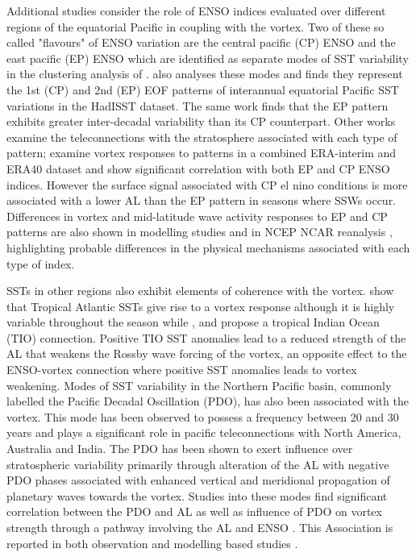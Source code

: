 Additional studies consider the role of ENSO indices evaluated over different regions of the equatorial Pacific in coupling with the vortex. Two of these so called  "flavours" of ENSO variation are the central pacific (CP) ENSO and the east pacific (EP) ENSO which are identified as separate modes of SST variability in the clustering analysis of \citep{johnsonHow2013a}. \cite{kaoContrasting2009} also analyses these modes and finds they represent the 1st (CP) and 2nd (EP) EOF patterns of interannual equatorial Pacific SST variations in the HadISST dataset. The same work finds that the EP pattern exhibits greater inter-decadal variability than its CP counterpart. Other works examine the teleconnections with the stratosphere associated with each type of pattern; \cite{izaRole2015} examine vortex responses to patterns in a combined ERA-interim and ERA40 dataset and show significant correlation with both EP and CP ENSO indices. However the surface signal associated with CP el nino conditions is more associated with a lower AL than the EP pattern in seasons where SSWs occur. Differences in vortex and mid-latitude wave activity responses to EP and CP patterns are also shown in modelling studies \citep{hegyiDynamical2011} and in NCEP NCAR reanalysis \citep{sungAltered2014}, highlighting probable differences in the physical mechanisms associated with each type of index. 

SSTs in other regions also exhibit elements of coherence with the vortex. \cite{raoVarying2018} show that Tropical Atlantic SSTs give rise to a vortex response although it is highly variable throughout the season while \cite{fletcherRole2011}, \cite{fletcherLinear2013} and \cite{raoDecomposition2016} propose a tropical Indian Ocean (TIO) connection. Positive TIO SST anomalies lead to a reduced strength of the AL that weakens the Rossby wave forcing of the vortex, an opposite effect to the ENSO-vortex connection where positive SST anomalies leads to vortex weakening. Modes of SST variability in the Northern Pacific basin, commonly labelled the Pacific Decadal Oscillation (PDO), has also been associated with the vortex. This mode has been observed to possess a frequency between 20 and 30 years \citep{henleyTripole2015} and plays a significant role in pacific teleconnections with North America, Australia and India. The PDO has been shown to exert influence over stratospheric variability primarily through alteration of the AL with negative PDO phases associated with enhanced vertical and meridional propagation of planetary waves towards the vortex. Studies into these modes find significant correlation between the PDO and AL \citep{mantuaPacific1997, rodionovSpatial2005} as well as influence of PDO on vortex strength through a pathway involving the AL and ENSO \citep{raoModulation2019}. This Association is reported in both observation and modelling based studies \citep{garcia-herreraPropagation2006, krenWintertime2016, huDecadal2018}.

